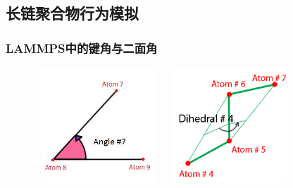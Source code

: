 %
\subsection{长链聚合物行为模拟}

\frame
{
	\frametitle{\textrm{LAMMPS}中的键角与二面角}
\begin{figure}[h!]
\centering
\vskip -5pt
\includegraphics[height=1.70in,width=1.9in, viewport=0 0 320 280,clip]{Figures/Lammps-Angles_between_atoms.jpeg}
\includegraphics[height=1.70in,width=1.9in, viewport=0 0 280 250,clip]{Figures/Lammps-Dihedral_angles_between_atoms.jpeg}
\caption{\fontsize{6.2pt}{5.2pt}}%
\label{LAMMPS_Angle-and-Dihedral_angle}
\end{figure}
}

